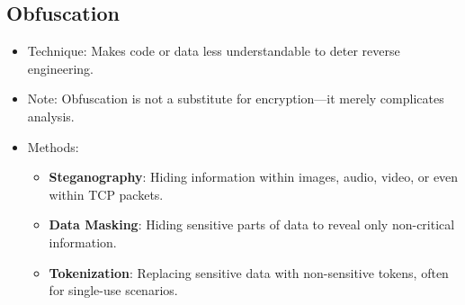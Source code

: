 \documentclass[11pt]{article}
\begin{document}
\subsection{Obfuscation}
\label{sec:orgaf7820b}
\begin{itemize}
\item Technique: Makes code or data less understandable to deter reverse engineering.
\item Note: Obfuscation is not a substitute for encryption—it merely complicates analysis.
\item Methods:
\begin{itemize}
\item \textbf{Steganography}: Hiding information within images, audio, video, or even within TCP packets.
\item \textbf{Data Masking}: Hiding sensitive parts of data to reveal only non-critical information.
\item \textbf{Tokenization}: Replacing sensitive data with non-sensitive tokens, often for single-use scenarios.
\end{itemize}
\end{itemize}
\end{document}
